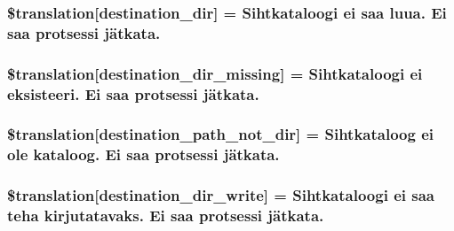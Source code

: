 \subsubsection[{\$translation}]{\setlength{\rightskip}{0pt plus 5cm}\$translation\mbox{[}\textquotesingle{}destination\+\_\+dir\textquotesingle{}\mbox{]} = \textquotesingle{}Sihtkataloogi ei saa luua. Ei saa protsessi jätkata.\textquotesingle{}}\label{class_8upload_8et___e_e_8php_aff2427c72a2598aefa6d58df1dd18b08}
\hypertarget{class_8upload_8et___e_e_8php_a9ef28d3cf09942c6c0a1e77fa09185e8}{}
\subsubsection[{\$translation}]{\setlength{\rightskip}{0pt plus 5cm}\$translation\mbox{[}\textquotesingle{}destination\+\_\+dir\+\_\+missing\textquotesingle{}\mbox{]} = \textquotesingle{}Sihtkataloogi ei eksisteeri. Ei saa protsessi jätkata.\textquotesingle{}}\label{class_8upload_8et___e_e_8php_a9ef28d3cf09942c6c0a1e77fa09185e8}
\hypertarget{class_8upload_8et___e_e_8php_a5704a67137126e8c87b7a364175929d4}{}
\subsubsection[{\$translation}]{\setlength{\rightskip}{0pt plus 5cm}\$translation\mbox{[}\textquotesingle{}destination\+\_\+path\+\_\+not\+\_\+dir\textquotesingle{}\mbox{]} = \textquotesingle{}Sihtkataloog ei ole kataloog. Ei saa protsessi jätkata.\textquotesingle{}}\label{class_8upload_8et___e_e_8php_a5704a67137126e8c87b7a364175929d4}
\hypertarget{class_8upload_8et___e_e_8php_a97608ea194a616db49141a0e6dee900c}{}
\subsubsection[{\$translation}]{\setlength{\rightskip}{0pt plus 5cm}\$translation\mbox{[}\textquotesingle{}destination\+\_\+dir\+\_\+write\textquotesingle{}\mbox{]} = \textquotesingle{}Sihtkataloogi ei saa teha kirjutatavaks. Ei saa protsessi jätkata.\textquotesingle{}}\label{class_8upload_8et___e_e_8php_a97608ea194a616db49141a0e6dee900c}
\hypertarget{class_8upload_8et___e_e_8php_a40e4e1962226b89fd76da5819a9602b0}{}
